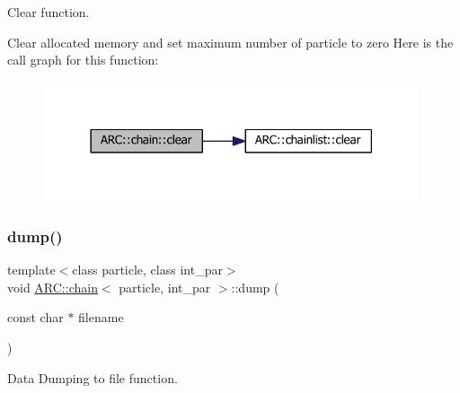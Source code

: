 Clear function. 

Clear allocated memory and set maximum number of particle to zero Here is the call graph for this function\+:
\nopagebreak
\begin{figure}[H]
\begin{center}
\leavevmode
\includegraphics[width=314pt]{classARC_1_1chain_a61d47f9599d4f7176b8870f825305011_cgraph}
\end{center}
\end{figure}
\hypertarget{classARC_1_1chain_a6b7202e64c0a4f5d4f3f8a31f9d27e20}{}\label{classARC_1_1chain_a6b7202e64c0a4f5d4f3f8a31f9d27e20} 
\subsubsection{\texorpdfstring{dump()}{dump()}}
{\footnotesize\ttfamily template$<$class particle, class int\+\_\+par$>$ \\
void \hyperlink{classARC_1_1chain}{A\+R\+C\+::chain}$<$ particle, int\+\_\+par $>$\+::dump (\begin{DoxyParamCaption}\item[{const char $\ast$}]{filename }\end{DoxyParamCaption})\hspace{0.3cm}{\ttfamily [inline]}}



Data Dumping to file function. 

